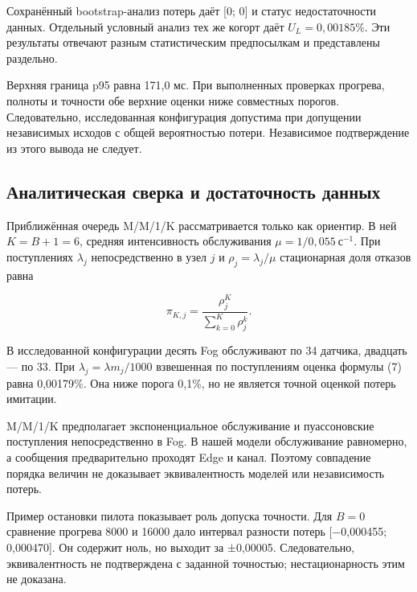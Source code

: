 Сохранённый bootstrap-анализ потерь даёт {[}0; 0{]} и статус недостаточности данных. Отдельный условный анализ тех же когорт даёт \(U_L=0{,}00185\%\). Эти результаты отвечают разным статистическим предпосылкам и представлены раздельно.

Верхняя граница p95 равна 171,0 мс. При выполненных проверках прогрева, полноты и точности обе верхние оценки ниже совместных порогов. Следовательно, исследованная конфигурация допустима при допущении независимых исходов с общей вероятностью потери. Независимое подтверждение из этого вывода не следует.

\hypertarget{ux430ux43dux430ux43bux438ux442ux438ux447ux435ux441ux43aux430ux44f-ux441ux432ux435ux440ux43aux430-ux438-ux434ux43eux441ux442ux430ux442ux43eux447ux43dux43eux441ux442ux44c-ux434ux430ux43dux43dux44bux445}{%
\subsection{Аналитическая сверка и достаточность данных}}

Приближённая очередь M/M/1/K рассматривается только как ориентир. В ней \(K=B+1=6\), средняя интенсивность обслуживания \(\mu=1/0{,}055\ \text{с}^{-1}\). При поступлениях \(\lambda_j\) непосредственно в узел \(j\) и \(\rho_j=\lambda_j/\mu\) стационарная доля отказов равна

\begin{equation}\label{eq:7}
\pi_{K,j}=\frac{\rho_j^K}{\displaystyle\sum_{k=0}^{K}\rho_j^k}.
\end{equation}

В исследованной конфигурации десять Fog обслуживают по 34 датчика, двадцать --- по 33. При \(\lambda_j=\lambda m_j/1000\) взвешенная по поступлениям оценка формулы (7) равна 0,00179\%. Она ниже порога 0,1\%, но не является точной оценкой потерь имитации.

M/M/1/K предполагает экспоненциальное обслуживание и пуассоновские поступления непосредственно в Fog. В нашей модели обслуживание равномерно, а сообщения предварительно проходят Edge и канал. Поэтому совпадение порядка величин не доказывает эквивалентность моделей или независимость потерь.

Пример остановки пилота показывает роль допуска точности. Для \(B=0\) сравнение прогрева 8000 и 16000 дало интервал разности потерь {[}−0,000455; 0,000470{]}. Он содержит ноль, но выходит за ±0,00005. Следовательно, эквивалентность не подтверждена с заданной точностью; нестационарность этим не доказана.

